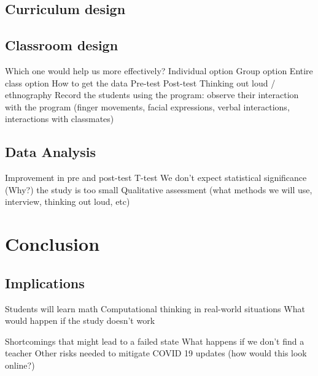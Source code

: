 \documentclass[12pt]{extarticle}
\begin{document}
\subsection*{Curriculum design}
\subsection*{Classroom design}
Which one would help us more effectively?
Individual option
Group option
Entire class option
How to get the data
	Pre-test
	Post-test
	Thinking out loud / ethnography
		Record the students using the program: observe their interaction with the program (finger movements, facial expressions, verbal interactions, interactions with classmates)
\subsection*{Data Analysis}
Improvement in pre and post-test
T-test
We don’t expect statistical significance (Why?) the study is too small 
Qualitative assessment (what methods we will use, interview, thinking out loud, etc)
\section*{Conclusion}
\subsection*{Implications}
Students will learn math
Computational thinking in real-world situations
What would happen if the study doesn’t work

Shortcomings that might lead to a failed state
What happens if we don’t find a teacher
Other risks needed to mitigate
COVID 19 updates (how would this look online?)
\cite{sherin}



\end{document}

